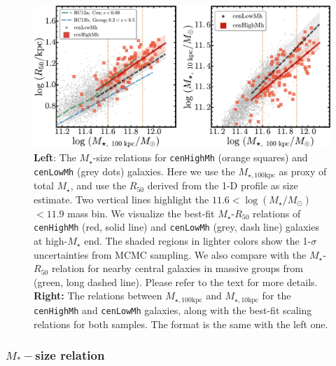\documentclass{emulateapj}
\def\rbcg{\texttt{cenHighMh}}
\def\nbcg{\texttt{cenLowMh}}
\def\mstar{{$M_{\star}$}}
\def\logms{{$\log (M_{\star}/M_{\odot})$}}
\def\minn{{$M_{\star,10\mathrm{kpc}}$}}
\def\mtot{{$M_{\star,100\mathrm{kpc}}$}}
\begin{document}
\begin{CJK*}{UTF8}{gbsn}
  \begin{figure}[bt!]
      \centering 
      \includegraphics[width=\textwidth]{fig/redbcg_scaling_relation}
      \caption{\textbf{Left}: The \mstar{}-size relations for \rbcg{} 
          (orange squares) and \nbcg{} (grey dots) galaxies. 
          Here we use the \mtot{} as proxy of total \mstar{}, and use the 
          $R_{\mathrm{50}}$ derived from the 1-D profile as size estimate. 
          Two vertical lines highlight the $11.6<$\logms{}$<11.9$ mass bin.
          We visualize the best-fit \mstar{}-$R_{\mathrm{50}}$ relations of \rbcg{} 
          (red, solid line) and \nbcg{} (grey, dash line) galaxies at high-\mstar{} end.
          The shaded regions in lighter colors show the 1-$\sigma$ uncertainties
          from MCMC sampling. 
          We also compare with the \mstar{}-$R_{\mathrm{50}}$ relation for nearby central 
          galaxies in massive groups from \citet{HCompany13} (green, long dashed line). 
          Please refer to the text for more details.~
          \textbf{Right:} The relations between \mtot{} and \minn{} for the 
          \rbcg{} and \nbcg{} galaxies, along with the best-fit scaling relations for 
          both samples.  The format is the same with the left one.
          }
      \label{fig:scaling_relation} 
  \end{figure}

\subsubsection{$M_{\ast}-$size relation}
    \label{sssec:mass_size}
        

\end{CJK*}
\end{document}
